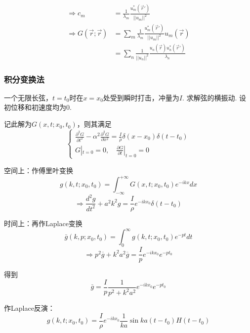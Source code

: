 \begin{ex}
$$\begin{aligned}
    \Rightarrow c_{m}&=\frac{1}{\lambda_{m}}\frac{u_{m}^{*}(\vec{r}')}{||u_{m}||^{2}}\\
    \Rightarrow G(\vec{r};\vec{r})&=\sum_{m}\frac{1}{\lambda_{m}}\frac{u_{m}^{*}(\vec{r}')}{||u_{m}||^{2}}u_{m}(\vec{r})\\
    &=\sum_{n}\frac{1}{||u_{n}||^{2}}\frac{u_{n}(\vec{r})u_{n}^{*}(\vec{r}')}{\lambda_{n}}
\end{aligned}$$

\end{ex}

\subsubsection{积分变换法}
\begin{ex}[无穷长弦横振动]
    一个无限长弦，$t=t_0$时在$x=x_0$处受到瞬时打击，冲量为$I$. 求解弦的横振动. 设初位移和初速度均为0.

    记此解为$G(x,t;x_0,t_0)$，则其满足
    $$\begin{cases}
        \frac{\partial^{2}G}{\partial t^{2}}-\alpha^{2}\frac{\partial^{2}G}{\partial x^{2}}=\frac{I}{\rho}\delta(x-x_{0})\delta(t-t_{0})\\
        G|_{t=0}=0,\quad\frac{\partial G}{\partial t}|_{t=0}=0
    \end{cases}$$

    空间上：作傅里叶变换
    $$g(k,t;x_{0},t_{0})=\int_{-\infty}^{+\infty}G(x,t;x_{0},t_{0})e^{-ikx}dx$$
    $$\Rightarrow\frac{d^{2}g}{dt^{2}}+a^{2}k^{2}g=\frac{I}{\rho}e^{-ikx_{0}}\delta(t-t_{0})$$

    时间上：再作Laplace变换
    $$\bar{g}(k,p;x_{0},t_{0})=\int_{0}^{\infty}g(k,t;x_{0},t_{0})e^{-pt}dt$$
    $$\Rightarrow p^{2}\overline{g}+k^{2}a^{2}\overline{g}=\frac{I}{p}e^{-ikx_{0}}e^{-pt_{0}}$$

    得到
    $$\bar{g}=\frac{I}{p}\frac{1}{p^{2}+k^{2}a^{2}}e^{-ikx_{0}}e^{-pt_{0}}$$

    作Laplace反演：
    $$g(k,t;x_0,t_0)=\frac{I}{\rho}e^{-ikx_{0}}\frac{1}{ka}\sin ka(t-t_{0})H(t-t_{0})$$
    

\end{ex}
